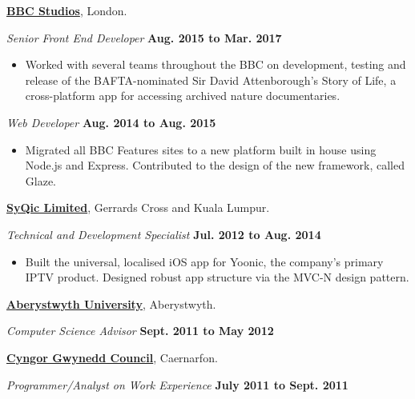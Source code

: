 \documentclass[11pt]{article}
\newenvironment{innerlist}[1][\enskip\textbullet]%
        {\begin{itemize}[#1,leftmargin=*,parsep=0pt,itemsep=0pt,topsep=0pt,partopsep=0pt]}
        {\end{itemize}}
\newcommand{\halfblankline}{\quad\vspace{-0.5\baselineskip}\pagebreak[3]}
\begin{document}
\halfblankline

\href{https://www.bbcstudios.com}{\textbf{BBC Studios}},
London.

\halfblankline

\textit{Senior Front End Developer}%
        \hfill \textbf{Aug. 2015 to Mar. 2017}
\begin{innerlist}
\item Worked with several teams throughout the BBC on development, testing and release of the BAFTA-nominated Sir David Attenborough's Story of Life, a cross-platform app for accessing archived nature documentaries.
\end{innerlist}

\halfblankline

\textit{Web Developer}%
        \hfill \textbf{Aug. 2014 to Aug. 2015}
\begin{innerlist}
\item Migrated all BBC Features sites to a new platform built in house using Node.js and Express. Contributed to the design of the new framework, called Glaze.
\end{innerlist}

\halfblankline

\href{http://www.syqic.com}{\textbf{SyQic Limited}},
Gerrards Cross and Kuala Lumpur.

\halfblankline

\textit{Technical and Development Specialist}%
        \hfill \textbf{Jul. 2012 to Aug. 2014}
\begin{innerlist}
\item Built the universal, localised iOS app for Yoonic, the company's primary IPTV product. Designed robust app structure via the MVC-N design pattern.
\end{innerlist}

\halfblankline

\href{http://www.aber.ac.uk}{\textbf{Aberystwyth University}},
Aberystwyth.

\halfblankline

\textit{Computer Science Advisor}%
        \hfill \textbf{Sept. 2011 to May 2012}

\halfblankline

\href{http://www.gwynedd.gov.uk}{\textbf{Cyngor Gwynedd Council}},
Caernarfon.

\halfblankline

\textit{Programmer/Analyst on Work Experience}%
        \hfill \textbf{July 2011 to Sept. 2011}

\halfblankline
\end{document}
